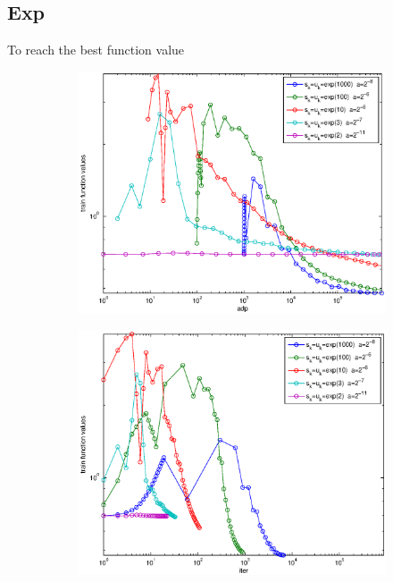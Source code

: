 \documentclass[12pt]{article}
\begin{document}
	\subsection{Exp}
	To reach the best function value
	\begin{figure}[H]
	\begin{subfigure}[b]{.5\linewidth}
		        \includegraphics[width=4in]{Figures/19-1-1.eps}
	\end{subfigure}%
	\begin{subfigure}[b]{.5\linewidth}
		        \includegraphics[width=4in]{Figures/19-1-2.eps}
	\end{subfigure}%


\end{figure}
\end{document}
